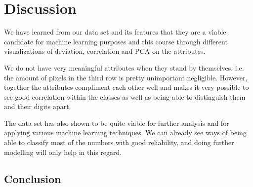 \chapter{Discussion}
We have learned from our data set and its features that they are a viable candidate for machine learning purposes and this course through different visualizations of deviation, correlation and PCA on the attributes. 

We do not have very meaningful attributes when they stand by themselves, i.e. the amount of pixels in the third row is pretty unimportant negligible. However, together the attributes compliment each other well and makes it very possible to see good correlation within the classes as well as being able to distinguish them and their digits apart.

The data set has also shown to be quite viable for further analysis and for applying various machine learning techniques. We can already see ways of being able to classify most of the numbers with good reliability, and doing further modelling will only help in this regard.

\section{Conclusion}
